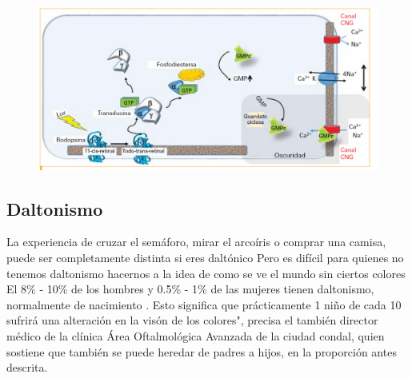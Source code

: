 \documentclass[10pt]{article}
\begin{document}
\setlength{\parskip}{2mm}

\begin{figure}[H]
	\begin{center}
\includegraphics[scale = 0.52]{Imagenes/cascada.png}
	\end{center} 
\end{figure}

\subsection{Daltonismo}

La experiencia de cruzar el semáforo, mirar el arcoíris o comprar una camisa, puede ser completamente distinta si eres daltónico
Pero es difícil para quienes no tenemos daltonismo hacernos a la idea de como se ve el mundo sin ciertos colores
El 8\% - 10\% de los hombres y 0.5\% - 1\% de las mujeres tienen daltonismo, normalmente de nacimiento \cite{IEEEreferencias:Ref25}\cite{IEEEreferencias:Ref26}.
Esto significa que prácticamente 1 niño de cada 10 sufrirá una alteración en la visón de los colores", precisa el también director médico de la clínica Área Oftalmológica Avanzada de la ciudad condal, quien sostiene que también se puede heredar de padres a hijos, en la proporción antes descrita\cite{IEEEreferencias:Ref26}.
\end{document}
